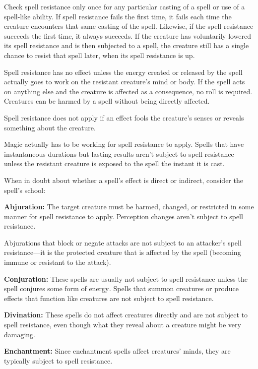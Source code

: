 \documentclass{article}
\begin{document}
Check spell resistance only once for any particular casting of a spell or use of 
a spell-like ability. If spell resistance fails the first time, it fails each time 
the creature encounters that same casting of the spell. Likewise, if the spell 
resistance succeeds the first time, it always succeeds. If the creature has voluntarily 
lowered its spell resistance and is then subjected to a spell, the creature still 
has a single chance to resist that spell later, when its spell resistance is up.

Spell resistance has no effect unless the energy created or released by the spell 
actually goes to work on the resistant creature's mind or body. If the spell acts 
on anything else and the creature is affected as a consequence, no roll is required. 
Creatures can be harmed by a spell without being directly affected. 

Spell resistance does not apply if an effect fools the creature's senses or reveals 
something about the creature.

Magic actually has to be working for spell resistance to apply. Spells that have 
instantaneous durations but lasting results aren't subject to spell resistance 
unless the resistant creature is exposed to the spell the instant it is cast. 

When in doubt about whether a spell's effect is direct or indirect, consider the 
spell's school:

\textbf{Abjuration:} The target creature must be harmed, changed, or restricted 
in some manner for spell resistance to apply. Perception changes aren't subject 
to spell resistance.

Abjurations that block or negate attacks are not subject to an attacker's spell 
resistance---it is the protected creature that is affected by the spell (becoming 
immune or resistant to the attack).

\textbf{Conjuration:} These spells are usually not subject to spell resistance 
unless the spell conjures some form of energy\textit{. }Spells that summon creatures 
or produce effects that function like creatures are not subject to spell resistance.

\textbf{Divination:} These spells do not affect creatures directly and are not 
subject to spell resistance, even though what they reveal about a creature might 
be very damaging.

\textbf{Enchantment:} Since enchantment spells affect creatures' minds, they are 
typically subject to spell resistance.
\end{document}
